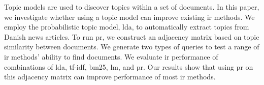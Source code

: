 Topic models are used to discover topics within a set of documents.
In this paper, we investigate whether using a topic model can improve existing \acrlong{ir} methods.
We employ the probabilistic topic model, \acrlong{lda}, to automatically extract topics from Danish news articles.
To run \acrlong{pr}, we construct an adjacency matrix based on topic similarity between documents.
We generate two types of queries to test a range of \acrlong{ir} methods' ability to find documents.
We evaluate \acrlong{ir} performance of combinations of \acrlong{lda}, \acrlong{tf-idf}, \acrlong{bm25}, \acrlong{lm}, and \acrlong{pr}.
Our results show that using \acrlong{pr} on this adjacency matrix can improve performance of most \acrlong{ir} methods.
